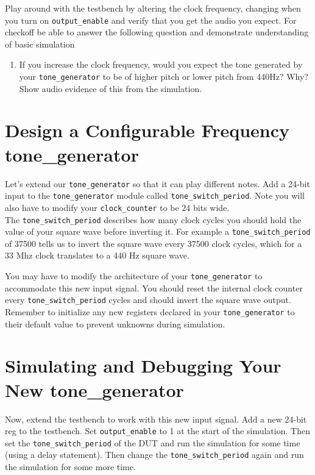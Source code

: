 \documentclass[11pt]{article}
\begin{document}
Play around with the testbench by altering the clock frequency, changing when you turn on \verb|output_enable| and verify that you get the audio you expect. For checkoff be able to answer the following question and demonstrate understanding of basic simulation

\begin{enumerate}
	\item If you increase the clock frequency, would you expect the tone generated by your \verb|tone_generator| to be of higher pitch or lower pitch from 440Hz? Why? Show audio evidence of this from the simulation.
\end{enumerate}

\section{Design a Configurable Frequency tone\_generator}

Let's extend our \verb|tone_generator| so that it can play different notes. Add a 24-bit input to the \verb|tone_generator| module called \verb|tone_switch_period|. Note you will also have to modify your \verb|clock_counter| to be 24 bits wide.\\

The \verb|tone_switch_period| describes how many clock cycles you should hold the value of your square wave before inverting it. For example a \verb|tone_switch_period| of 37500 tells us to invert the square wave every 37500 clock cycles, which for a 33 Mhz clock translates to a 440 Hz square wave.

You may have to modify the architecture of your \verb|tone_generator| to accommodate this new input signal. You should reset the internal clock counter every \verb|tone_switch_period| cycles and should invert the square wave output. Remember to initialize any new registers declared in your \verb|tone_generator| to their default value to prevent unknowns during simulation.

\section{Simulating and Debugging Your New tone\_generator}

Now, extend the testbench to work with this new input signal. Add a new 24-bit reg to the testbench. Set \verb|output_enable| to 1 at the start of the simulation. Then set the \verb|tone_switch_period| of the DUT and run the simulation for some time (using a delay statement). Then change the \verb|tone_switch_period| again and run the simulation for some more time.\\
\end{document}
